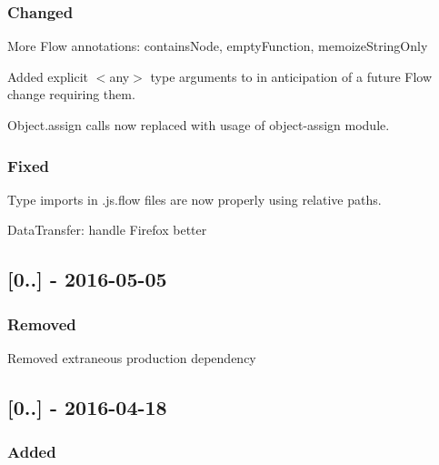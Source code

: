 \subsubsection*{Changed}


\begin{DoxyItemize}
\item More Flow annotations\+: {\ttfamily contains\+Node}, {\ttfamily empty\+Function}, {\ttfamily memoize\+String\+Only}
\item Added explicit {\ttfamily $<$any$>$} type arguments to in anticipation of a future Flow change requiring them.
\item {\ttfamily Object.\+assign} calls now replaced with usage of {\ttfamily object-\/assign} module.
\end{DoxyItemize}

\subsubsection*{Fixed}


\begin{DoxyItemize}
\item Type imports in .js.\+flow files are now properly using relative paths.
\item {\ttfamily Data\+Transfer}\+: handle Firefox better
\end{DoxyItemize}

\subsection*{\mbox{[}0..\mbox{]} -\/ 2016-\/05-\/05}

\subsubsection*{Removed}


\begin{DoxyItemize}
\item Removed extraneous production dependency
\end{DoxyItemize}

\subsection*{\mbox{[}0..\mbox{]} -\/ 2016-\/04-\/18}

\subsubsection*{Added}


